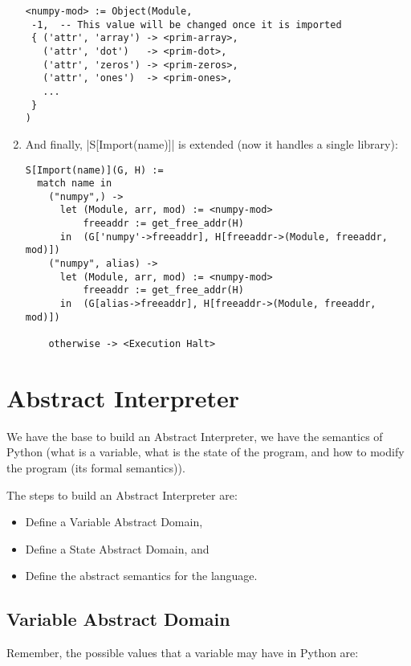 \begin{enumerate}
\begin{verbatim}
<numpy-mod> := Object(Module,
 -1,  -- This value will be changed once it is imported
 { ('attr', 'array') -> <prim-array>,
   ('attr', 'dot')   -> <prim-dot>,
   ('attr', 'zeros') -> <prim-zeros>,
   ('attr', 'ones')  -> <prim-ones>,
   ...
 }
)
\end{verbatim}
\item
  And finally, \pycode|S[Import(name)]| is extended (now it handles
  a single library):

\begin{verbatim}
S[Import(name)](G, H) :=
  match name in
    ("numpy",) ->
      let (Module, arr, mod) := <numpy-mod>
          freeaddr := get_free_addr(H)
      in  (G['numpy'->freeaddr], H[freeaddr->(Module, freeaddr, mod)])
    ("numpy", alias) ->
      let (Module, arr, mod) := <numpy-mod>
          freeaddr := get_free_addr(H)
      in  (G[alias->freeaddr], H[freeaddr->(Module, freeaddr, mod)])

    otherwise -> <Execution Halt>
\end{verbatim}
\end{enumerate}

\section{Abstract Interpreter}\label{abstract-interpreter}

{}

We have the base to build an Abstract Interpreter, we have the semantics
of Python (what is a variable, what is the state of the program, and how
to modify the program (its formal semantics)).

The steps to build an Abstract Interpreter are:

\begin{itemize}
\tightlist
\item
  Define a Variable Abstract Domain,
\item
  Define a State Abstract Domain, and
\item
  Define the abstract semantics for the language.
\end{itemize}

\subsection{Variable Abstract Domain}\label{variable-abstract-domain}

Remember, the possible values that a variable may have in Python are:

